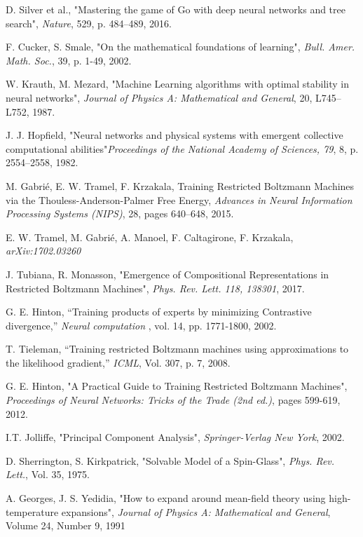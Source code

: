 \begin{thebibliography}{9}

D. Silver et al., "Mastering the game of Go with deep neural networks and tree search",
\textit{Nature}, 529, p. 484–489, 2016.

F. Cucker, S. Smale, "On the mathematical foundations of learning",
\textit{Bull. Amer. Math. Soc.}, 39, p. 1-49, 2002.

W. Krauth, M. Mezard, "Machine Learning algorithms with optimal stability in neural networks",
\textit{Journal of Physics A: Mathematical and General}, 20, L745–L752, 1987.

J. J. Hopfield, "Neural networks and physical systems with emergent collective computational abilities"\textit{Proceedings of the National Academy of Sciences, 79}, 8, p. 2554–2558, 1982.

M. Gabri\'e, E. W. Tramel, F. Krzakala,
Training Restricted Boltzmann Machines via the Thouless-Anderson-Palmer Free Energy,
\textit{Advances in Neural Information Processing Systems (NIPS)}, 28, pages 640--648, 2015.

E. W. Tramel, M. Gabri\'e, A. Manoel, F. Caltagirone, F. Krzakala, \textit{arXiv:1702.03260}

J. Tubiana, R. Monasson, "Emergence of Compositional Representations in Restricted Boltzmann Machines",
\textit{Phys. Rev. Lett. 118, 138301}, 2017.

G. E. Hinton, “Training products of experts by minimizing Contrastive divergence,”
\textit{Neural computation}
, vol. 14, pp. 1771-1800, 2002.

T. Tieleman, “Training restricted Boltzmann machines using approximations to the likelihood gradient,”
\textit{ICML}, Vol. 307, p. 7, 2008.

G. E. Hinton, "A Practical Guide to Training Restricted Boltzmann Machines", \textit{Proceedings of Neural Networks: Tricks of the Trade (2nd ed.)}, pages 599-619, 2012. 

I.T. Jolliffe, "Principal Component Analysis",
\textit{Springer-Verlag New York}, 2002.

D. Sherrington, S. Kirkpatrick,
"Solvable Model of a Spin-Glass",
\textit{Phys. Rev. Lett.}, Vol. 35, 1975.

A. Georges, J. S. Yedidia,
"How to expand around mean-field theory using high-temperature expansions",
\textit{Journal of Physics A: Mathematical and General}, Volume 24, Number 9, 1991


\end{thebibliography}
